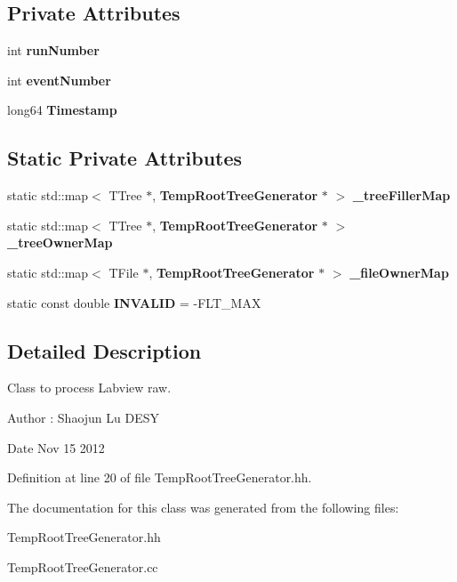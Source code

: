 \subsection*{Private Attributes}
\begin{DoxyCompactItemize}
\item 
int {\bfseries runNumber}\label{classCALICE_1_1TempRootTreeGenerator_ab6b2729ac1b292d2ee2fea66a9594703}

\item 
int {\bfseries eventNumber}\label{classCALICE_1_1TempRootTreeGenerator_a9d25e5c9fd0dbb2f75e1a3e149e45169}

\item 
long64 {\bfseries Timestamp}\label{classCALICE_1_1TempRootTreeGenerator_a987d676226994b2120f47c457551ba09}

\end{DoxyCompactItemize}
\subsection*{Static Private Attributes}
\begin{DoxyCompactItemize}
\item 
static std::map$<$ TTree $\ast$, {\bf TempRootTreeGenerator} $\ast$ $>$ {\bfseries \_\-treeFillerMap}\label{classCALICE_1_1TempRootTreeGenerator_a5aecfdab878099a4ea0a74e4b96652de}

\item 
static std::map$<$ TTree $\ast$, {\bf TempRootTreeGenerator} $\ast$ $>$ {\bfseries \_\-treeOwnerMap}\label{classCALICE_1_1TempRootTreeGenerator_a991022195e98911f7e5674c9ad674cce}

\item 
static std::map$<$ TFile $\ast$, {\bf TempRootTreeGenerator} $\ast$ $>$ {\bfseries \_\-fileOwnerMap}\label{classCALICE_1_1TempRootTreeGenerator_acf9f072ece6ac7300b4a6ef878bdb947}

\item 
static const double {\bfseries INVALID} = -\/FLT\_\-MAX\label{classCALICE_1_1TempRootTreeGenerator_ab51bc9fd4548675bdad7f48208a3c943}

\end{DoxyCompactItemize}


\subsection{Detailed Description}
Class to process Labview raw. \begin{DoxyAuthor}{Author}
: Shaojun Lu DESY 
\end{DoxyAuthor}
\begin{DoxyDate}{Date}
Nov 15 2012 
\end{DoxyDate}


Definition at line 20 of file TempRootTreeGenerator.hh.

The documentation for this class was generated from the following files:\begin{DoxyCompactItemize}
\item 
TempRootTreeGenerator.hh\item 
TempRootTreeGenerator.cc\end{DoxyCompactItemize}
